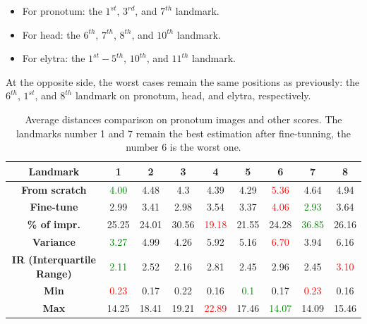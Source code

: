 \documentclass[review]{elsarticle}
\begin{document}
\begin{itemize}
	\item For pronotum: the $1^{st}$, $3^{rd}$, and $7^{th}$ landmark.
	\item For head: the $6^{th}$, $7^{th}$, $8^{th}$, and $10^{th}$ landmark.
	\item For elytra: the $1^{st} - 5 ^{th}$, $10^{th}$, and $11^{th}$ landmark.
\end{itemize}

At the opposite side, the worst cases remain the same positions as previously: the $6^{th}$, $1^{st}$, and $8^{th}$ landmark on pronotum, head, and elytra, respectively.

\begin{table}[h!]
	\centering
	\begin{tabular}{| c || c | c | c | c | c | c | c | c |}
		\hline
		\textbf{Landmark} & 1 & 2 & 3 & 4 & 5 & 6 & 7 & 8 \\ \hline \hline
		\textbf{From scratch} & \textcolor{green}{4.00} & 4.48 & 4.3 & 4.39 & 4.29 & \textcolor{red}{5.36} & 4.64 & 4.94 \\ \hline
		\textbf{Fine-tune} & 2.99 & 3.41 & 2.98 & 3.54 & 3.37 & \textcolor{red}{4.06} & \textcolor{green}{2.93} & 3.64 \\ \hline 
		\textbf{\% of impr.} & 25.25 & 24.01 & 30.56 & \textcolor{red}{19.18} & 21.55 & 24.28 & \textcolor{green}{36.85} & 26.16 \\ \hline \hline
		\textbf{Variance} & \textcolor{green}{3.27} & 4.99 & 4.26 & 5.92 & 5.16 & \textcolor{red}{6.70} & 3.94 & 6.16 \\ \hline 
		\textbf{IR (Interquartile Range)} & \textcolor{green}{2.11} & 2.52 & 2.16 & 2.81 & 2.45 & 2.96 & 2.45 & \textcolor{red}{3.10} \\ \hline 
		\textbf{Min} & \textcolor{red}{0.23} & 0.17 & 0.22 & 0.16 & \textcolor{green}{0.1} & 0.17 & \textcolor{red}{0.23} & 0.16 \\ \hline
		\textbf{Max} & 14.25 & 18.41 & 19.21 & \textcolor{red}{22.89} & 17.46 & \textcolor{green}{14.07} & 14.09 & 15.46 \\ \hline 
	\end{tabular}
	\caption{Average distances comparison on pronotum images and other scores. The landmarks number 1 and 7 remain the best estimation
          after fine-tunning, the number 6 is the worst one. }
	\label{tblfn_pronotum}
\end{table}
\end{document}
